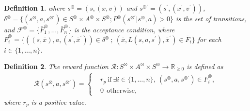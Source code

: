 \documentclass[letterpaper, 10 pt, conference]{ieeeconf}  %
\newtheorem{definition}{Definition}
\begin{document}
\begin{definition}

  where $s^{\otimes}=(s,(x,v))$ and $s^{\otimes \prime}=(s^{\prime},(x^{\prime},v^{\prime}))$,
  $\delta^{\otimes} = \{ (s^{\otimes}, a, s^{\otimes \prime}) \in S^{\otimes} \times A^{\otimes} \times S^{\otimes} ; P^{\otimes}(s^{\otimes \prime} | s^{\otimes}, a) > 0 \}$ is the set of transitions, and ${\mathcal F}^{\otimes} = \{ \bar{F}^{\otimes}_1, \ldots ,\bar{F}^{\otimes}_n \}$ is the acceptance condition, where $\bar{F}^{\otimes}_i = \{ ((s,\bar{x}), a, (s^{\prime}, \bar{x}^{\prime})) \in \delta^{\otimes}\ ;\ (\bar{x}, L(s,a,s^{\prime}), \bar{x}^{\prime}) \in \bar{F}_i \}$ for each $ i \in \{ 1, \ldots ,n \}$.

\end{definition}

\begin{definition}
  The reward function $\mathcal{R} :S^{\otimes} \times A^{\otimes} \times S^{\otimes} \rightarrow {\mathbb R}_{\geq 0}$ is defined as
  \begin{align}
    \mathcal{R}(s^{\otimes}, a, s^{\otimes \prime}) =
    \left\{
    \begin{aligned}
      &r_p \  \text{if}\ \exists i \in \! \{ 1, \ldots ,n \},\ (s^{\otimes}, a, s^{\otimes \prime}) \in \bar{F}^{\otimes}_i \!,\\
      &0   \ \ \text{otherwise},
    \end{aligned}
    \right. \nonumber
  \end{align}
  where $r_p$ is a positive value.
\end{definition}
\end{document}
